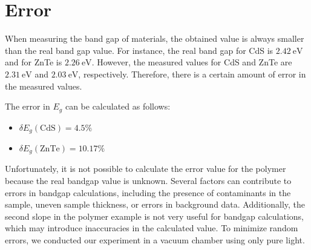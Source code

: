 \section{Error}

	When measuring the band gap of materials, the obtained value is always smaller than the real band gap value. For instance, the real band gap for CdS is $2.42~\text{eV}$ and for ZnTe is $2.26~\text{eV}$. However, the measured values for CdS and ZnTe are $2.31~\text{eV}$ and $2.03~\text{eV}$, respectively. Therefore, there is a certain amount of error in the measured values.

	The error in $E_g$ can be calculated as follows:
	\begin{itemize}
	\item $\delta E_g(\text{CdS})=4.5\%$
	\item $\delta E_g(\text{ZnTe})=10.17\%$
	\end{itemize}

	Unfortunately, it is not possible to calculate the error value for the polymer because the real bandgap value is unknown. Several factors can contribute to errors in bandgap calculations, including the presence of contaminants in the sample, uneven sample thickness, or errors in background data. Additionally, the second slope in the polymer example is not very useful for bandgap calculations, which may introduce inaccuracies in the calculated value. To minimize random errors, we conducted our experiment in a vacuum chamber using only pure light.


